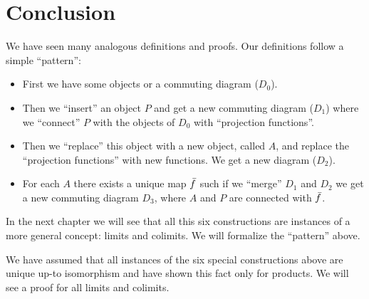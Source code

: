 \section*{Conclusion}
We have seen many analogous definitions and proofs.
Our definitions follow a simple ``pattern'':
\begin{itemize}
  \item First we have some objects or a commuting diagram ($D_0$).
  \item Then we ``insert'' an object $P$ and get a new commuting diagram ($D_1$) where we ``connect'' $P$ with the objects of $D_0$ with ``projection functions''.
  \item Then we ``replace'' this object with a new object, called $A$, and replace the ``projection functions'' with new functions. We get a new diagram ($D_2$).
  \item For each $A$ there exists a unique map $\bar{f}$ such if we ``merge'' $D_1$ and $D_2$ we get a new commuting diagram $D_3$, where $A$ and $P$ are connected with $\bar{f}$.
\end{itemize}

In the next chapter we will see that all this six constructions are instances of a more general concept: limits and colimits.
We will formalize the ``pattern'' above.

We have assumed that all instances of the six special constructions above are unique up-to isomorphism
and have shown this fact only for products. We will see a proof for all limits and colimits.



